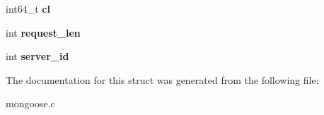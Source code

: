 \begin{DoxyCompactItemize}
\item 
\hypertarget{structconnection_a0831315235b6847023a1bccd1a90b511}{int64\-\_\-t {\bfseries cl}}\label{structconnection_a0831315235b6847023a1bccd1a90b511}

\item 
\hypertarget{structconnection_aaaceaa100948785092d6a1d0522c679b}{int {\bfseries request\-\_\-len}}\label{structconnection_aaaceaa100948785092d6a1d0522c679b}

\item 
\hypertarget{structconnection_a258db6dcad4ef66ca24cd51e04ffa5c0}{int {\bfseries server\-\_\-id}}\label{structconnection_a258db6dcad4ef66ca24cd51e04ffa5c0}

\end{DoxyCompactItemize}


The documentation for this struct was generated from the following file\-:\begin{DoxyCompactItemize}
\item 
mongoose.\-c\end{DoxyCompactItemize}
